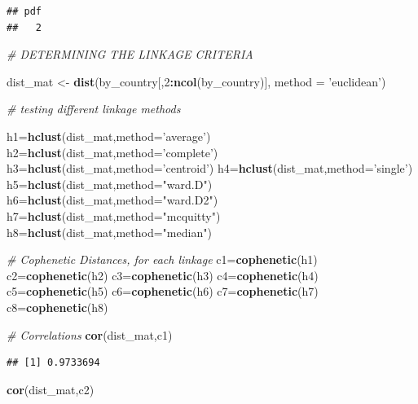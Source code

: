 \documentclass[]{article}
\newenvironment{Shaded}{\begin{snugshade}}{\end{snugshade}}
\newcommand{\CommentTok}[1]{\textcolor[rgb]{0.56,0.35,0.01}{\textit{#1}}}
\newcommand{\DataTypeTok}[1]{\textcolor[rgb]{0.13,0.29,0.53}{#1}}
\newcommand{\DecValTok}[1]{\textcolor[rgb]{0.00,0.00,0.81}{#1}}
\newcommand{\KeywordTok}[1]{\textcolor[rgb]{0.13,0.29,0.53}{\textbf{#1}}}
\newcommand{\NormalTok}[1]{#1}
\newcommand{\OperatorTok}[1]{\textcolor[rgb]{0.81,0.36,0.00}{\textbf{#1}}}
\newcommand{\StringTok}[1]{\textcolor[rgb]{0.31,0.60,0.02}{#1}}
\begin{document}
\begin{verbatim}
## pdf 
##   2
\end{verbatim}

\begin{Shaded}
\begin{Highlighting}[]
\CommentTok{# DETERMINING THE LINKAGE CRITERIA}

\NormalTok{dist_mat <-}\StringTok{ }\KeywordTok{dist}\NormalTok{(by_country[,}\DecValTok{2}\OperatorTok{:}\KeywordTok{ncol}\NormalTok{(by_country)], }\DataTypeTok{method =} \StringTok{'euclidean'}\NormalTok{)}

\CommentTok{# testing different linkage methods}

\NormalTok{h1=}\KeywordTok{hclust}\NormalTok{(dist_mat,}\DataTypeTok{method=}\StringTok{'average'}\NormalTok{)}
\NormalTok{h2=}\KeywordTok{hclust}\NormalTok{(dist_mat,}\DataTypeTok{method=}\StringTok{'complete'}\NormalTok{)}
\NormalTok{h3=}\KeywordTok{hclust}\NormalTok{(dist_mat,}\DataTypeTok{method=}\StringTok{'centroid'}\NormalTok{)}
\NormalTok{h4=}\KeywordTok{hclust}\NormalTok{(dist_mat,}\DataTypeTok{method=}\StringTok{'single'}\NormalTok{)}
\NormalTok{h5=}\KeywordTok{hclust}\NormalTok{(dist_mat,}\DataTypeTok{method=}\StringTok{"ward.D"}\NormalTok{)}
\NormalTok{h6=}\KeywordTok{hclust}\NormalTok{(dist_mat,}\DataTypeTok{method=}\StringTok{"ward.D2"}\NormalTok{)}
\NormalTok{h7=}\KeywordTok{hclust}\NormalTok{(dist_mat,}\DataTypeTok{method=}\StringTok{"mcquitty"}\NormalTok{)}
\NormalTok{h8=}\KeywordTok{hclust}\NormalTok{(dist_mat,}\DataTypeTok{method=}\StringTok{"median"}\NormalTok{)}

\CommentTok{# Cophenetic Distances, for each linkage}
\NormalTok{c1=}\KeywordTok{cophenetic}\NormalTok{(h1)}
\NormalTok{c2=}\KeywordTok{cophenetic}\NormalTok{(h2)}
\NormalTok{c3=}\KeywordTok{cophenetic}\NormalTok{(h3)}
\NormalTok{c4=}\KeywordTok{cophenetic}\NormalTok{(h4)}
\NormalTok{c5=}\KeywordTok{cophenetic}\NormalTok{(h5)}
\NormalTok{c6=}\KeywordTok{cophenetic}\NormalTok{(h6)}
\NormalTok{c7=}\KeywordTok{cophenetic}\NormalTok{(h7)}
\NormalTok{c8=}\KeywordTok{cophenetic}\NormalTok{(h8)}

\CommentTok{# Correlations}
\KeywordTok{cor}\NormalTok{(dist_mat,c1) }
\end{Highlighting}
\end{Shaded}

\begin{verbatim}
## [1] 0.9733694
\end{verbatim}

\begin{Shaded}
\begin{Highlighting}[]
\KeywordTok{cor}\NormalTok{(dist_mat,c2) }
\end{Highlighting}
\end{Shaded}
\end{document}
